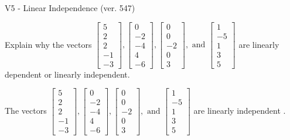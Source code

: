 \begin{exercise}
  \begin{exerciseTitle}V5 - Linear Independence (ver. 547)\end{exerciseTitle}
  \begin{exerciseStatement}
    Explain why the vectors \(\left[\begin{array}{r}
5 \\
2 \\
2 \\
-1 \\
-3
\end{array}\right] , \left[\begin{array}{r}
0 \\
-2 \\
-4 \\
4 \\
-6
\end{array}\right] , \left[\begin{array}{r}
0 \\
0 \\
-2 \\
0 \\
3
\end{array}\right] , \text{ and } \left[\begin{array}{r}
1 \\
-5 \\
1 \\
3 \\
5
\end{array}\right]\) are linearly dependent or linearly independent.	


  \end{exerciseStatement}
  \begin{exerciseAnswer}
   The vectors \(\left[\begin{array}{r}
5 \\
2 \\
2 \\
-1 \\
-3
\end{array}\right] , \left[\begin{array}{r}
0 \\
-2 \\
-4 \\
4 \\
-6
\end{array}\right] , \left[\begin{array}{r}
0 \\
0 \\
-2 \\
0 \\
3
\end{array}\right] , \text{ and } \left[\begin{array}{r}
1 \\
-5 \\
1 \\
3 \\
5
\end{array}\right]\) are 
  	 linearly independent  .
  


  \end{exerciseAnswer}
\end{exercise}